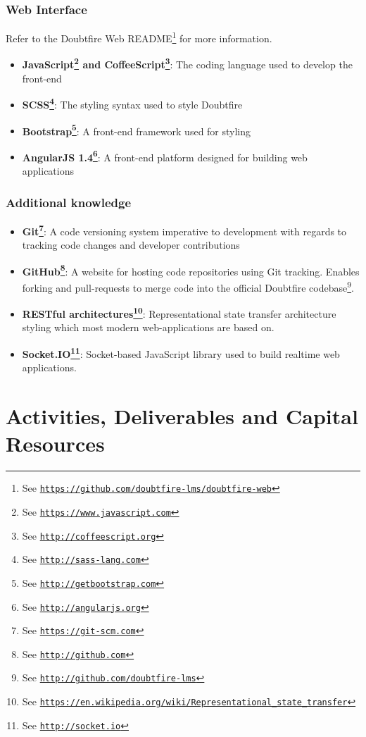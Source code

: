 \documentclass[12pt,a4paper,]{article}
\renewcommand{\href}[2]{#2\footnote{See \texttt{\url{#1}}}}
\providecommand{\tightlist}{%
  \setlength{\itemsep}{0pt}\setlength{\parskip}{0pt}}
\begin{document}
\subsubsection{Web Interface}\label{web-interface}

Refer to the Doubtfire Web
\href{https://github.com/doubtfire-lms/doubtfire-web}{README} for more
information.

\begin{itemize}
\tightlist
\item
  \textbf{\href{https://www.javascript.com}{JavaScript} and
  \href{http://coffeescript.org}{CoffeeScript}}: The coding language
  used to develop the front-end
\item
  \textbf{\href{http://sass-lang.com}{SCSS}}: The styling syntax used to
  style Doubtfire
\item
  \textbf{\href{http://getbootstrap.com}{Bootstrap}}: A front-end
  framework used for styling
\item
  \textbf{\href{http://angularjs.org}{AngularJS 1.4}}: A front-end
  platform designed for building web applications
\end{itemize}

\subsubsection{Additional knowledge}\label{additional-knowledge}

\begin{itemize}
\tightlist
\item
  \textbf{\href{https://git-scm.com}{Git}}: A code versioning system
  imperative to development with regards to tracking code changes and
  developer contributions
\item
  \textbf{\href{http://github.com}{GitHub}}: A website for hosting code
  repositories using Git tracking. Enables forking and pull-requests to
  merge code into the \href{http://github.com/doubtfire-lms}{official
  Doubtfire codebase}.
\item
  \textbf{\href{https://en.wikipedia.org/wiki/Representational_state_transfer}{RESTful
  architectures}}: Representational state transfer architecture styling
  which most modern web-applications are based on.
\item
  \textbf{\href{http://socket.io}{Socket.IO}}: Socket-based JavaScript
  library used to build realtime web applications.
\end{itemize}

\section{Activities, Deliverables and Capital
Resources}\label{activities-deliverables-and-capital-resources}
\end{document}
